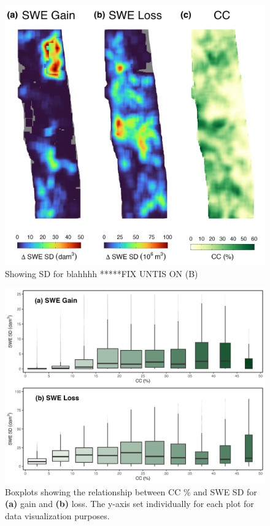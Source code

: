 \clearpage
\begin{figure}[t]
\centering
\includegraphics[width=\textwidth]{figures/ch4_figs/sd_vs_cc_map_dam3_41x41.png}
\caption{Showing SD for blahhhh *****FIX UNTIS ON (B)}
\label{fig:dswe_standard_deviation}
\end{figure}

\clearpage
\begin{figure}[t]
\centering
\includegraphics[width=\textwidth]{figures/ch4_figs/swe_sd_bp_dam3_41x41_v1.png}
\caption{Boxplots showing the relationship between CC \% and SWE SD for \textbf{(a)} gain and \textbf{(b)} loss. The y-axis set individually for each plot for data visualization purposes.}
\label{fig:dswe_boxplots}
\end{figure}






